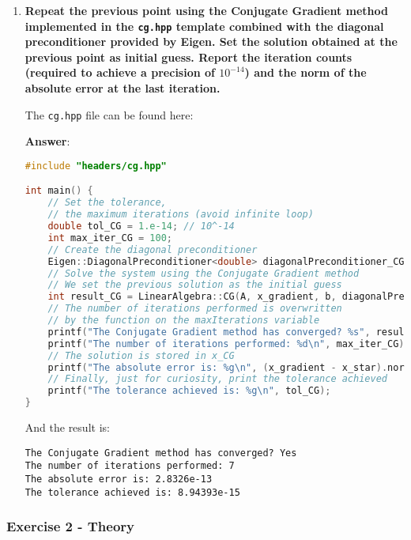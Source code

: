 \begin{enumerate}[label=\textcolor{Green3}{\textbf{\arabic*.}}]
    \item \textcolor{Green3}{\textbf{%
        Repeat the previous point using the Conjugate Gradient method implemented in the \texttt{cg.hpp} template combined with the diagonal preconditioner provided by Eigen. Set the solution obtained at the previous point as initial guess. Report the iteration counts (required to achieve a precision of $10^{-14}$) and the norm of the absolute error at the last iteration.
    }}

    The \texttt{cg.hpp} file can be found here:
    \begin{center}
    \end{center}

    \textbf{Answer}:
    \begin{lstlisting}[language=C++]
#include "headers/cg.hpp"

int main() {
    // Set the tolerance,
    // the maximum iterations (avoid infinite loop)
    double tol_CG = 1.e-14; // 10^-14
    int max_iter_CG = 100;
    // Create the diagonal preconditioner
    Eigen::DiagonalPreconditioner<double> diagonalPreconditioner_CG(A);
    // Solve the system using the Conjugate Gradient method
    // We set the previous solution as the initial guess
    int result_CG = LinearAlgebra::CG(A, x_gradient, b, diagonalPreconditioner_CG, max_iter_CG, tol_CG);
    // The number of iterations performed is overwritten
    // by the function on the maxIterations variable
    printf("The Conjugate Gradient method has converged? %s", result_CG ? "No\n" : "Yes\n");
    printf("The number of iterations performed: %d\n", max_iter_CG);
    // The solution is stored in x_CG
    printf("The absolute error is: %g\n", (x_gradient - x_star).norm());
    // Finally, just for curiosity, print the tolerance achieved
    printf("The tolerance achieved is: %g\n", tol_CG);
}\end{lstlisting}
    And the result is:
    \begin{lstlisting}
The Conjugate Gradient method has converged? Yes
The number of iterations performed: 7
The absolute error is: 2.8326e-13
The tolerance achieved is: 8.94393e-15\end{lstlisting}
\end{enumerate}


\newpage

\subsubsection*{Exercise 2 - Theory}

